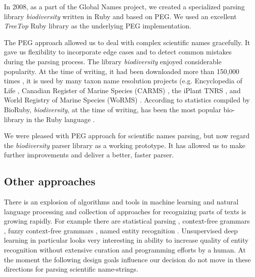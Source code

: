 \documentclass{bmcart}
\begin{document}
In 2008, as a part of the Global Names project, we created a specialized parsing library \textit{biodiversity} \cite{biodiversity} written in Ruby and based on PEG\@. We used an excellent \textit{TreeTop} Ruby library \cite{treetop} as the underlying PEG implementation.

The PEG approach allowed us to deal with complex scientific names gracefully.  It gave us flexibility to incorporate edge cases and to detect common mistakes during the parsing process. The library \textit{biodiversity} enjoyed considerable popularity. At the time of writing, it had been downloaded more than 150,000 times \cite{bdiv-downloads}, it is used by many taxon name resolution projects (e.g. Encyclopedia of Life \cite{eol}, Canadian Register of Marine Species (CARMS) \cite{carms}, the iPlant TNRS \cite{iplant}, and World Registry of Marine Species (WoRMS) \cite{worms}. According to statistics compiled by BioRuby, \textit{biodiversity}, at the time of writing, has been the most popular bio-library in the Ruby language \cite{biogems}.

We were pleased with PEG approach for scientific names parsing, but now regard the \textit{biodiversity} parser library as a working prototype. It has allowed us to make further improvements and deliver a better, faster parser.

\subsection*{Other approaches}


There is an explosion of algorithms and tools in machine learning and natural language processing and collection of approaches for recognizing parts of texts is growing rapidly. For example there are statistical parsing \cite{charniak1996statistical}, context-free grammars \cite{aho1972theory}, fuzzy context-free grammars \cite{asveld1995fuzzy}, named entity recognition \cite{nadeau2007survey}. Unsupervised deep learning \cite{mikolov2013distributed, schmidhuber2015deep} in particular looks very interesting in ability to increase quality of entity recognition without extensive curation and programming efforts by a human. At the moment the following design goals influence our decision do not move in these directions for parsing scientific name-strings.
\end{document}
